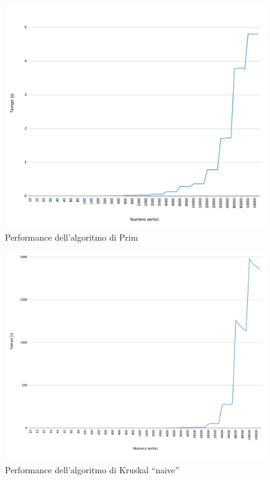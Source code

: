 \begin{figure}[H]
	\hspace{-1cm}\includegraphics[width=19cm]{Img/prim_result.png}
	\caption{Performance dell'algoritmo di Prim}
\end{figure}
\begin{figure}[H]
	\hspace{-1cm}\includegraphics[width=18.5cm]{Img/kruskal_naive_result.png}
	\caption{Performance dell'algoritmo di Kruskal ``naive''}
\end{figure}
